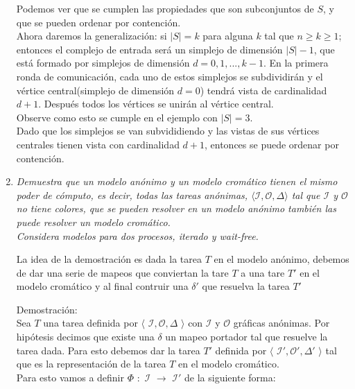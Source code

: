 \documentclass{article}
\begin{document}
\begin{enumerate}
{\begin{center}
    \end{center}
    Podemos ver que se cumplen las propiedades que son subconjuntos de $S$, y que se pueden ordenar por contención.\\
    Ahora daremos la generalización: si $|S| = k$ para alguna $k$ tal que $n ≥ k ≥ 1$; entonces el complejo de entrada
    será un simplejo de dimensión $|S| - 1$, que está formado por simplejos de dimensión $d = 0, 1, ..., k-1$. En la primera
    ronda de comunicación, cada uno de estos simplejos se subdividirán y el vértice central(simplejo de dimensión $d = 0$) tendrá
    vista de cardinalidad $d + 1$. Después todos los vértices se unirán al vértice central.\\
    Observe como esto se cumple en el ejemplo con $|S| = 3$.\\
    Dado que los simplejos se van subvididiendo y las vistas de sus vértices centrales tienen vista con cardinalidad $d + 1$, entonces
    se puede ordenar por contención.
  }
  
\item{
    \textsl{
      Demuestra que un modelo anónimo y un modelo cromático tienen el mismo poder de cómputo, es
      decir, todas las tareas anónimas, $\langle \mathcal{I},\mathcal{O},\Delta \rangle$ tal que
      $\mathcal{I}$ y $\mathcal{O}$ no tiene colores, que se pueden resolver en un modelo anónimo
      también las puede resolver un modelo cromático.\\
      Considera modelos para dos procesos, iterado y wait-free.\\
    }

    La idea de la demostración es dada la tarea $T$ en el modelo anónimo, debemos de dar una serie de mapeos
    que conviertan la tare $T$ a una tare $T'$ en el modelo cromático y al final contruir una $\delta'$ que resuelva
    la tarea $T'$

    Demostración:\\
    Sea $T$ una tarea definida por $\langle$ $\mathcal{I},\mathcal{O},\Delta$ $\rangle$ con $\mathcal{I}$
    y $\mathcal{O}$ gráficas anónimas. Por hipótesis decimos que existe una $\delta$ un mapeo portador
    tal que resuelve la tarea dada.
    Para esto debemos dar la tarea $T'$ definida por $\langle$ $\mathcal{I}',\mathcal{O}',\Delta'$ $\rangle$
    tal que es la representación de la tarea $T$ en el modelo cromático.\\
    Para esto vamos a definir $\Phi$ $:$ $\mathcal{I}$ $\xrightarrow{}$ $\mathcal{I}'$ de la siguiente forma:\\

}
\end{enumerate}
\end{document}
